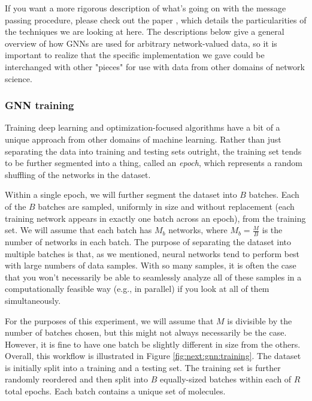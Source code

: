 If you want a more rigorous description of what's going on with the message passing procedure, please check out the paper \cite{SanchezLengeling2021Sep}, which details the particularities of the techniques we are looking at here. The descriptions below give a general overview of how GNNs are used for arbitrary network-valued data, so it is important to realize that the specific implementation we gave could be interchanged with other "pieces" for use with data from other domains of network science.

\subsubsection*{GNN training}

Training deep learning and optimization-focused algorithms have a bit of a unique approach from other domains of machine learning. Rather than just separating the data into training and testing sets outright, the training set tends to be further segmented into a thing, called an \textit{epoch}, which represents a random shuffling of the networks in the dataset.

Within a single epoch, we will further segment the dataset into $B$ batches. Each of the $B$ batches are sampled, uniformly in size and without replacement (each training network appears in exactly one batch across an epoch), from the training set. We will assume that each batch has $M_b$ networks, where $M_b = \frac{M}{B}$ is the number of networks in each batch. The purpose of separating the dataset into multiple batches is that, as we mentioned, neural networks tend to perform best with large numbers of data samples. With so many samples, it is often the case that you won't necessarily be able to seamlessly analyze all of these samples in a computationally feasible way (e.g., in parallel) if you look at all of them simultaneously. 

For the purposes of this experiment, we will assume that $M$ is divisible by the number of batches chosen, but this might not always necessarily be the case. However, it is fine to have one batch be slightly different in size from the others. Overall, this workflow is illustrated in Figure \ref{fig:next:gnn:training}. The dataset is initially split into a training and a testing set. The training set is further randomly reordered and then split into $B$ equally-sized batches within each of $R$ total epochs. Each batch contains a unique set of molecules.

